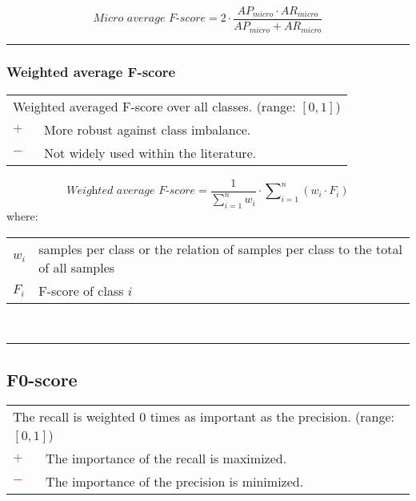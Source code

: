 \documentclass{article}
\makeatletter
\newenvironment{conditions}[1][where:]
	{\hspace{0.02\textwidth} #1 \begin{tabular}[t]{>{$}l<{$} @{${}={}$} l}}
	{\end{tabular}\\[\belowdisplayskip]}
\makeatother
\begin{document}
\begin{equation}
	\textit{Micro average F-score} = 2 \cdot \dfrac{\textit{AP}_\textit{micro} \cdot \textit{AR}_\textit{micro}}{\textit{AP}_\textit{micro} + \textit{AR}_\textit{micro}}
%
	\label{equation:MIAF}
\end{equation}

\hrule


\subsubsection[Weighted average F-score]{Weighted average F-score \cite{al2016lili, alswaidan2020hybrid}}

\begin{table}[H]\centering
	\begin{tabular}{m{}m{}}
		\multicolumn{2}{m{0.95\textwidth}}{Weighted averaged F-score over all classes. (range: $[0, 1]$)} \\
		\textcolor{Green}{$+$} & More robust against class imbalance. \\
		\textcolor{Red}{$-$}   & Not widely used within the literature.
	\end{tabular}
\end{table}

\begin{equation}
	\textit{Weighted average F-score} = \dfrac{1}{\sum\nolimits_{i = 1}^n w_i} \cdot \sum\nolimits_{i = 1}^n (w_i \cdot F_i)
%
	\label{equation:WAF}
\end{equation}
%
\begin{conditions}
	w_i & samples per class or the relation of samples per class to the total of all samples \\
	F_i & F-score of class $i$
\end{conditions}

\hrule


\subsection[F0-score]{F0-score \cite{van2004geometry, taha2015metrics}}

\begin{table}[H]\centering
	\begin{tabular}{m{}m{}}
		\multicolumn{2}{m{0.95\textwidth}}{The recall is weighted 0 times as important as the precision. (range: $[0, 1]$)} \\
		\textcolor{Green}{$+$} & The importance of the recall is maximized. \\
		\textcolor{Red}{$-$}   & The importance of the precision is minimized.
	\end{tabular}
\end{table}
\end{document}
